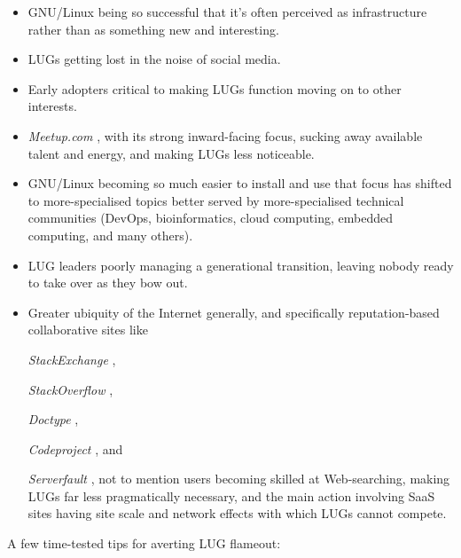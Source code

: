 \documentclass{HOWTO}
\begin{document}
\begin{itemize}
\item GNU/Linux being so successful that it's often perceived as
infrastructure rather than as something new and interesting.
\item LUGs getting lost in the noise of social media.
\item Early adopters critical to making LUGs function moving
on to other interests.
\item 
\emph{Meetup.com} \texttt{\absurl}
, with its strong inward-facing focus, sucking
away available talent and energy, and making LUGs less noticeable.
\item GNU/Linux becoming so much easier to install
and use that focus has shifted to more-specialised topics better served
by more-specialised technical communities (DevOps, bioinformatics,
cloud computing, embedded computing, and many others).
\item LUG leaders poorly managing a generational transition, 
leaving nobody ready to take over as they bow out.
\item Greater ubiquity of the Internet generally, and
specifically reputation-based collaborative sites like 

\emph{StackExchange} \texttt{\abturl}
,

\emph{StackOverflow} \texttt{\abuurl}
, 

\emph{Doctype} \texttt{\abvurl}
, 

\emph{Codeproject} \texttt{\abwurl}
, and 

\emph{Serverfault} \texttt{\abxurl}
, not to mention 
users becoming skilled at Web-searching, making LUGs far less
pragmatically necessary, and the main action involving SaaS sites having 
site scale and network effects with which LUGs cannot compete.
\end{itemize}


A few time-tested tips for averting LUG flameout:
\end{document}
